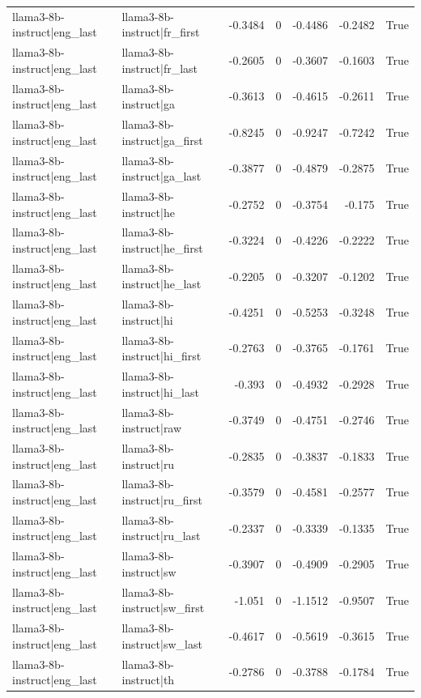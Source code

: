 \begin{table}
\begin{tabular}{l l r r r r l}
llama3-8b-instruct|eng_last & llama3-8b-instruct|fr_first & -0.3484 & 0 & -0.4486 & -0.2482 & True \\
llama3-8b-instruct|eng_last & llama3-8b-instruct|fr_last & -0.2605 & 0 & -0.3607 & -0.1603 & True \\
llama3-8b-instruct|eng_last & llama3-8b-instruct|ga & -0.3613 & 0 & -0.4615 & -0.2611 & True \\
llama3-8b-instruct|eng_last & llama3-8b-instruct|ga_first & -0.8245 & 0 & -0.9247 & -0.7242 & True \\
llama3-8b-instruct|eng_last & llama3-8b-instruct|ga_last & -0.3877 & 0 & -0.4879 & -0.2875 & True \\
llama3-8b-instruct|eng_last & llama3-8b-instruct|he & -0.2752 & 0 & -0.3754 & -0.175 & True \\
llama3-8b-instruct|eng_last & llama3-8b-instruct|he_first & -0.3224 & 0 & -0.4226 & -0.2222 & True \\
llama3-8b-instruct|eng_last & llama3-8b-instruct|he_last & -0.2205 & 0 & -0.3207 & -0.1202 & True \\
llama3-8b-instruct|eng_last & llama3-8b-instruct|hi & -0.4251 & 0 & -0.5253 & -0.3248 & True \\
llama3-8b-instruct|eng_last & llama3-8b-instruct|hi_first & -0.2763 & 0 & -0.3765 & -0.1761 & True \\
llama3-8b-instruct|eng_last & llama3-8b-instruct|hi_last & -0.393 & 0 & -0.4932 & -0.2928 & True \\
llama3-8b-instruct|eng_last & llama3-8b-instruct|raw & -0.3749 & 0 & -0.4751 & -0.2746 & True \\
llama3-8b-instruct|eng_last & llama3-8b-instruct|ru & -0.2835 & 0 & -0.3837 & -0.1833 & True \\
llama3-8b-instruct|eng_last & llama3-8b-instruct|ru_first & -0.3579 & 0 & -0.4581 & -0.2577 & True \\
llama3-8b-instruct|eng_last & llama3-8b-instruct|ru_last & -0.2337 & 0 & -0.3339 & -0.1335 & True \\
llama3-8b-instruct|eng_last & llama3-8b-instruct|sw & -0.3907 & 0 & -0.4909 & -0.2905 & True \\
llama3-8b-instruct|eng_last & llama3-8b-instruct|sw_first & -1.051 & 0 & -1.1512 & -0.9507 & True \\
llama3-8b-instruct|eng_last & llama3-8b-instruct|sw_last & -0.4617 & 0 & -0.5619 & -0.3615 & True \\
llama3-8b-instruct|eng_last & llama3-8b-instruct|th & -0.2786 & 0 & -0.3788 & -0.1784 & True \\

\end{tabular}
\end{table}
